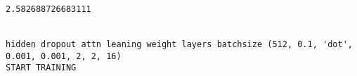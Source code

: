 \documentclass[11pt]{article}
\begin{document}
    \begin{center}
    \end{center}
    { \hspace*{\fill} \\}
    
    \begin{center}
    \end{center}
    { \hspace*{\fill} \\}
    
    \begin{Verbatim}[commandchars=\\\{\}]
2.582688726683111


hidden dropout attn leaning weight layers batchsize (512, 0.1, 'dot', 0.001, 0.001, 2, 2, 16)
START TRAINING



    \end{Verbatim}

    \begin{center}
    \end{center}
    { \hspace*{\fill} \\}
    
    \begin{center}
    \end{center}
    { \hspace*{\fill} \\}
    
    \begin{center}
    \end{center}
    { \hspace*{\fill} \\}
    
    \begin{center}
    \end{center}
    { \hspace*{\fill} \\}
    
    \begin{center}
    \end{center}
    { \hspace*{\fill} \\}
    
\end{document}
